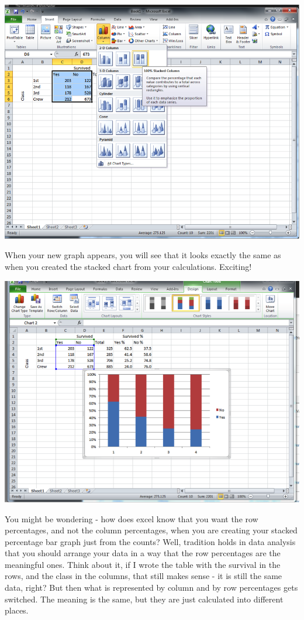 \documentclass[]{book}
\theoremstyle{definition}
\theoremstyle{definition}
\theoremstyle{definition}
\theoremstyle{remark}
\begin{document}
\includegraphics{imgs/stacked_col_perc.png}

When your new graph appears, you will see that it looks exactly the same
as when you created the stacked chart from your calculations. Exciting!

\includegraphics{imgs/stacked_col_perc_2.png}

You might be wondering - how does excel know that you want the row
percentages, and not the column percentages, when you are creating your
stacked percentage bar graph just from the counts? Well, tradition holds
in data analysis that you should arrange your data in a way that the row
percentages are the meaningful ones. Think about it, if I wrote the
table with the survival in the rows, and the class in the columns, that
still makes sense - it is still the same data, right? But then what is
represented by column and by row percentages gets switched. The meaning
is the same, but they are just calculated into different places.
\end{document}

